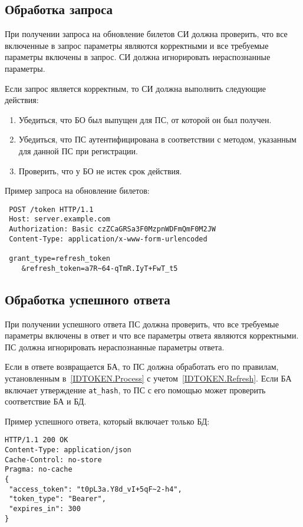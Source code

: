 \label{REQRESP.Refresh}

\subsection{Обработка запроса}\label{REQRESP.Refresh.Req}

При получении запроса на обновление билетов СИ должна проверить, что все 
включенные в запрос параметры являются корректными и все требуемые параметры 
включены в запрос.
%
СИ должна игнорировать нераспознанные параметры.

Если запрос является корректным, то СИ должна выполнить следующие действия:
\begin{enumerate}
\item 
Убедиться, что БО был выпущен для ПС, от которой он был получен.

\item 
Убедиться, что ПС аутентифицирована в соответствии с методом, указанным 
для данной ПС при регистрации.

\item 
Проверить, что у БО не истек срок действия.
\end{enumerate}

Пример запроса на обновление билетов:
\begin{lstlisting}
 POST /token HTTP/1.1
 Host: server.example.com
 Authorization: Basic czZCaGRSa3F0MzpnWDFmQmF0M2JW
 Content-Type: application/x-www-form-urlencoded

 grant_type=refresh_token
    &refresh_token=a7R~64-qTmR.IyT+FwT_t5
\end{lstlisting}

\subsection{Обработка успешного ответа}\label{REQRESP.Refresh.Resp}

При получении успешного ответа ПС должна проверить, что все
требуемые параметры включены в ответ и что все параметры ответа являются
корректными. ПС должна игнорировать нераспознанные параметры ответа.

Если в ответе возвращается БА, то ПС должна обработать его по правилам, 
установленным в~\ref{IDTOKEN.Process} с учетом~\ref{IDTOKEN.Refresh}. 
%
Если БА включает утверждение \lstinline{at_hash}, то ПС с его помощью 
может проверить соответствие БА и БД.

Пример успешного ответа, который включает только БД:
%
\begin{lstlisting}
HTTP/1.1 200 OK
Content-Type: application/json
Cache-Control: no-store
Pragma: no-cache
{
 "access_token": "t0pL3a.Y8d_vI+5qF~2-h4",
 "token_type": "Bearer",
 "expires_in": 300
}
\end{lstlisting}


